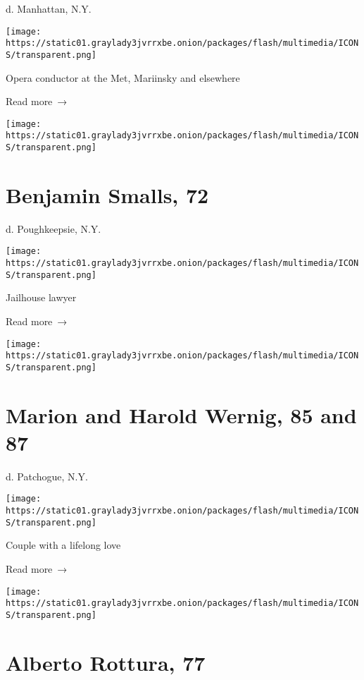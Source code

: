d. Manhattan, N.Y.

\texttt{[image: https://static01.graylady3jvrrxbe.onion/packages/flash/multimedia/ICONS/transparent.png]}

Opera conductor at the Met, Mariinsky and elsewhere

 Read more~→

\href{https://www.nytimes3xbfgragh.onion/2020/05/31/obituaries/benjamin-smalls-dead.html}{}

\texttt{[image: https://static01.graylady3jvrrxbe.onion/packages/flash/multimedia/ICONS/transparent.png]}

\hypertarget{benjamin-smalls-72}{%
\section{Benjamin Smalls, 72}\label{benjamin-smalls-72}}

d. Poughkeepsie, N.Y.

\texttt{[image: https://static01.graylady3jvrrxbe.onion/packages/flash/multimedia/ICONS/transparent.png]}

Jailhouse lawyer

 Read more~→

\href{https://www.nytimes3xbfgragh.onion/2020/05/29/obituaries/harold-and-marion-wernig-dead-coronavirus.html}{}

\texttt{[image: https://static01.graylady3jvrrxbe.onion/packages/flash/multimedia/ICONS/transparent.png]}

\hypertarget{marion-and-harold-wernig-85-and-87}{%
\section{Marion and Harold Wernig, 85 and
87}\label{marion-and-harold-wernig-85-and-87}}

d. Patchogue, N.Y.

\texttt{[image: https://static01.graylady3jvrrxbe.onion/packages/flash/multimedia/ICONS/transparent.png]}

Couple with a lifelong love

 Read more~→

\href{https://www.nytimes3xbfgragh.onion/2020/05/29/obituaries/alberto-rottura-dead-coronavirus.html}{}

\texttt{[image: https://static01.graylady3jvrrxbe.onion/packages/flash/multimedia/ICONS/transparent.png]}

\hypertarget{alberto-rottura-77}{%
\section{Alberto Rottura, 77}\label{alberto-rottura-77}}

